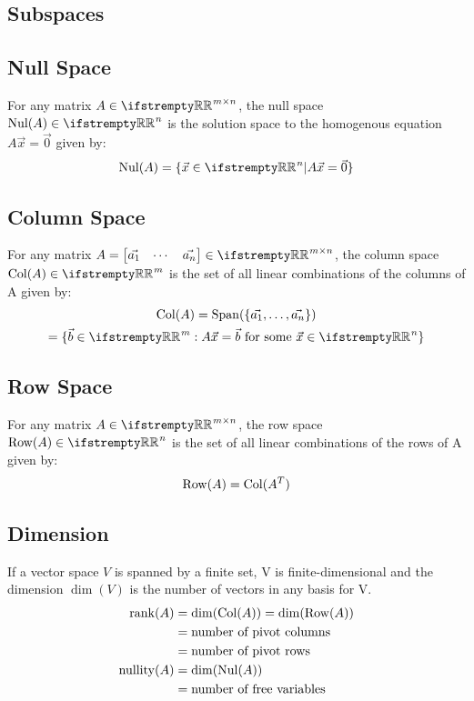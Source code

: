 \documentclass[12pt, a4paper]{article}
\begin{document}
\begin{multicols*}{3}
\colbreak

\section{Subspaces}

\subsection{Null Space}
For any matrix $A \in \RR^{m{\times}n}$, the null space $\nul(A) \in \RR^n$ is the solution space to the homogenous equation $A\vec{x} = \vec{0}$ given by:
\begin{align*}
  \nul(A) = \{\vec{x} \in \RR^n | A\vec{x} = \vec{0}\}
\end{align*}

\subsection{Column Space}
For any matrix $A = \begin{bmatrix}\vec{a_1} & \cdots & \vec{a_n}\end{bmatrix} \in \RR^{m{\times}n}$, the column space $\col(A) \in \RR^m$ is the set of all linear combinations of the columns of A given by:
\begin{gather*}
  \col(A) = \Span(\{\vec{a_1},\ldots,\vec{a_n}\}) \\
          = \{\vec{b} \in \RR^m : A\vec{x} = \vec{b} \text{ for some }\vec{x} \in \RR^n\}
\end{gather*}

\subsection{Row Space}
For any matrix $A \in \RR^{m{\times}n}$, the row space $\row(A) \in \RR^n$ is the set of all linear combinations of the rows of A given by:
\begin{align*}
  \operatorname{Row}(A) = \operatorname{Col}(A^T)
\end{align*}

\subsection{Dimension}
If a vector space $V$ is spanned by a finite set, V is finite-dimensional and the dimension $\dim(V)$ is the number of vectors in any basis for V.
\begin{align*}
  \operatorname{rank}(A) &= \dim(\operatorname{Col}(A)) = \dim(\operatorname{Row}(A)) \\
           &= \text{number of pivot columns} \\ 
           &= \text{number of pivot rows} \\
  \operatorname{nullity}(A) &= \dim(\operatorname{Nul}(A)) \\
              &= \text{number of free variables}
\end{align*}


\end{multicols*}
\end{document}
